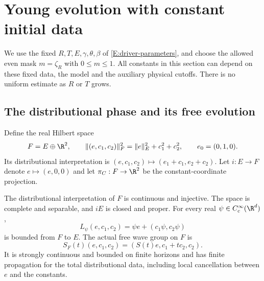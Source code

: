 \section{Young evolution with constant initial data}
\label{S:constant-phase-young}

We use the fixed $R,T,E,\gamma,\theta,\beta$ of
\eqref{E:driver-parameters}, and choose the allowed even mask
$m=\zeta_R$ with $0\le m\le1$. All constants in this section can depend
on these fixed data, the model and the auxiliary physical cutoffs.
There is no uniform estimate as $R$ or $T$ grows.

\subsection{The distributional phase and its free evolution}

Define the real Hilbert space
\begin{equation}\label{E:constant-phase-space}
  F=E\oplus\R^2,\qquad
  \|(e,c_1,c_2)\|_F^2=\|e\|_E^2+c_1^2+c_2^2,\qquad
  e_0=(0,1,0).
\end{equation}
Its distributional interpretation is
$(e,c_1,c_2)\mapsto(e_1+c_1,e_2+c_2)$.
Let $i:E\to F$ denote $e\mapsto(e,0,0)$ and let $\pi_C:F\to\R^2$
be the constant-coordinate projection.

\begin{lemma}\label{L:constant-phase-free}
  The distributional interpretation of $F$ is continuous and injective.
  The space is complete and separable, and $iE$ is closed and proper.
  For every real $\psi\in C_c^\infty(\R^d)$,
  \begin{equation}\label{E:constant-phase-cutoff}
    L_\psi(e,c_1,c_2)=\psi e+(c_1\psi,c_2\psi)
  \end{equation}
  is bounded from $F$ to $E$. The actual free wave group on $F$ is
  \begin{equation}\label{E:constant-phase-free}
    S_F(t)(e,c_1,c_2)=(S(t)e,c_1+tc_2,c_2).
  \end{equation}
  It is strongly continuous and bounded on finite horizons and has
  finite propagation for the total distributional data, including
  local cancellation between $e$ and the constants.
\end{lemma}

